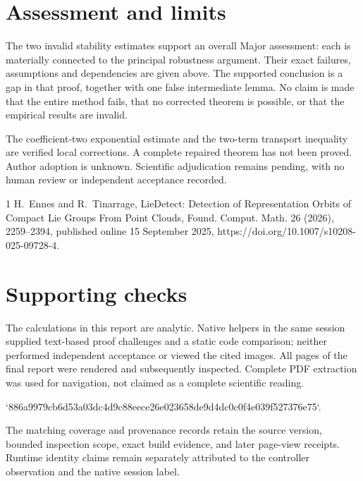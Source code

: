 \documentclass[10pt]{article}
\begin{document}
\section*{Assessment and limits}
The two invalid stability estimates support an overall Major assessment: each is materially connected to the principal robustness argument. Their exact failures, assumptions and dependencies are given above. The supported conclusion is a gap in that proof, together with one false intermediate lemma. No claim is made that the entire method fails, that no corrected theorem is possible, or that the empirical results are invalid.\par
The coefficient-two exponential estimate and the two-term transport inequality are verified local corrections. A complete repaired theorem has not been proved. Author adoption is unknown. Scientific adjudication remains pending, with no human review or independent acceptance recorded.\par
1 H. Ennes and R. Tinarrage, LieDetect: Detection of Representation Orbits of Compact Lie Groups From Point Clouds, Found. Comput. Math. 26 (2026), 2259–2394, published online 15 September 2025, https://doi.org/10.1007/s10208-025-09728-4.\par
\section*{Supporting checks}
The calculations in this report are analytic. Native helpers in the same session supplied text-based proof challenges and a static code comparison; neither performed independent acceptance or viewed the cited images. All pages of the final report were rendered and subsequently inspected. Complete PDF extraction was used for navigation, not claimed as a complete scientific reading.\par
`886a9979cb6d53a03dc4d9c88eece26e023658de9d4dc0c0f4e039f527376e75`.\par
The matching coverage and provenance records retain the source version, bounded inspection scope, exact build evidence, and later page-view receipts. Runtime identity claims remain separately attributed to the controller observation and the native session label.\par
\end{document}
